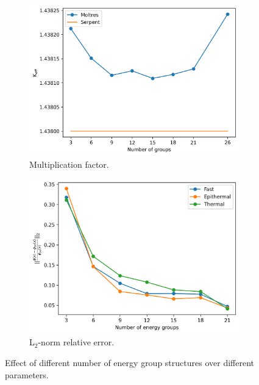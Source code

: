 \documentclass[11pt,letterpaper]{article}
\begin{document}
\begin{figure}[htbp!]
	\centering
	\begin{subfigure}[t]{0.4\textwidth}
		\centering
		\includegraphics[width=\linewidth]{figures/keff-noLBP-600}
		\caption{Multiplication factor.}
	\end{subfigure}
	\begin{subfigure}[t]{0.4\textwidth}
		\centering
		\includegraphics[width=\linewidth]{figures/noLBP-600-er-final}
		\caption{L$_2$-norm relative error.}
	\end{subfigure}
	\hfill
	\caption{Effect of different number of energy group structures over different parameters.}
	\label{fig:assembly-noLBP-600}
\end{figure}
\end{document}
